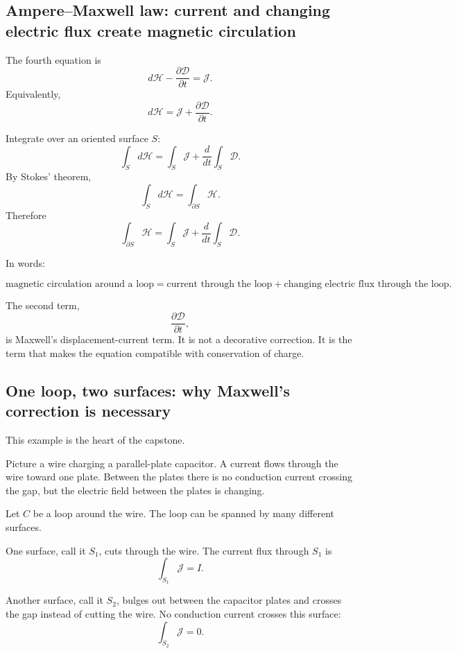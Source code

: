 \subsection{Ampere--Maxwell law: current and changing electric flux create magnetic circulation}

The fourth equation is
\[
\boxed{
    d\mathcal H-\frac{\partial\mathcal D}{\partial t}=\mathcal J.
}
\]
Equivalently,
\[
\boxed{
    d\mathcal H=\mathcal J+\frac{\partial\mathcal D}{\partial t}.
}
\]

Integrate over an oriented surface \(S\):
\[
    \int_S d\mathcal H
    =
    \int_S\mathcal J
    +
    \frac{d}{dt}\int_S\mathcal D.
\]
By Stokes' theorem,
\[
    \int_S d\mathcal H=\int_{\partial S}\mathcal H.
\]
Therefore
\[
\boxed{
    \int_{\partial S}\mathcal H
    =
    \int_S\mathcal J
    +
    \frac{d}{dt}\int_S\mathcal D.
}
\]

In words:

\[
\boxed{
    \text{magnetic circulation around a loop}
    =
    \text{current through the loop}
    +
    \text{changing electric flux through the loop.}
}
\]

The second term,
\[
    \frac{\partial\mathcal D}{\partial t},
\]
is Maxwell's displacement-current term.  It is not a decorative correction.  It is the
term that makes the equation compatible with conservation of charge.

\subsection{One loop, two surfaces: why Maxwell's correction is necessary}

This example is the heart of the capstone.

Picture a wire charging a parallel-plate capacitor.  A current flows through the wire
toward one plate.  Between the plates there is no conduction current crossing the gap,
but the electric field between the plates is changing.

Let \(C\) be a loop around the wire.  The loop can be spanned by many different
surfaces.

One surface, call it \(S_1\), cuts through the wire.  The current flux through \(S_1\) is
\[
    \int_{S_1}\mathcal J=I.
\]

Another surface, call it \(S_2\), bulges out between the capacitor plates and crosses the
gap instead of cutting the wire.  No conduction current crosses this surface:
\[
    \int_{S_2}\mathcal J=0.
\]

